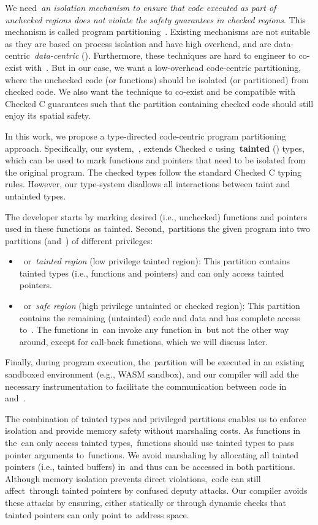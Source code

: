 We need~\emph{an isolation mechanism to ensure that code executed as part of unchecked regions does not violate the safety guarantees in checked regions}.
This mechanism is called program partitioning~\cite{rul2009towards}.
Existing mechanisms are not suitable as they are based on process isolation and have high overhead, and are data-centric~\emph{data-centric} ().
Furthermore, these techniques are hard to engineer to co-exist with~\checkedc.
But in our case, we want a low-overhead code-centric partitioning, where the unchecked code (or functions) should be isolated (or partitioned) from checked code. We also want the technique to co-exist and be compatible with Checked C guarantees such that the partition containing checked code should still enjoy its spatial safety.

In this work, we propose a type-directed code-centric program partitioning approach.
Specifically, our system,~\systemname, extends Checked c using~\textbf{tainted} (\taintt) types, which can be used to mark functions and pointers that need to be isolated from the original program.
The checked types follow the standard Checked C typing rules. However, our type-system disallows all interactions between taint and untainted types.
 
The developer starts by marking desired (i.e., unchecked) functions and pointers used in these functions as tainted.
Second,~\systemname partitions the given program into two partitions (\ucregion and~\cregion)  of different privileges:
\begin{itemize}
\item~\ucregion or~\emph{tainted region} (low privilege tainted region): This partition contains tainted types (i.e., functions and pointers) and can only access tainted pointers.
\item~\cregion or~\emph{safe region} (high privilege untainted or checked region): This partition contains the remaining (untainted) code and data and has complete access to~\cregion{}.
The functions in~\cregion can invoke any function in~\ucregion but not the other way around, except for call-back functions, which we will discuss later.
\end{itemize}
Finally, during program execution, the~\ucregion partition will be executed in an existing sandboxed environment (e.g., WASM sandbox), and our compiler will add the necessary instrumentation to facilitate the communication between code in~\cregion{} and~\ucregion{}.

The combination of tainted types and privileged partitions enables us to enforce isolation and provide memory safety without marshaling costs.
As functions in the~\ucregion can only access tainted types,~\cregion functions should use tainted types to pass pointer arguments to~\ucregion functions. 
We avoid marshaling by allocating all tainted pointers (i.e., tainted buffers) in~\ucregion and thus can be accessed in both partitions.
Although memory isolation prevents direct violations,~\ucregion code can still affect~\cregion through tainted pointers by confused deputy attacks.
Our compiler avoids these attacks by ensuring, either statically or through dynamic checks that tainted pointers can only point to~\ucregion address space.

